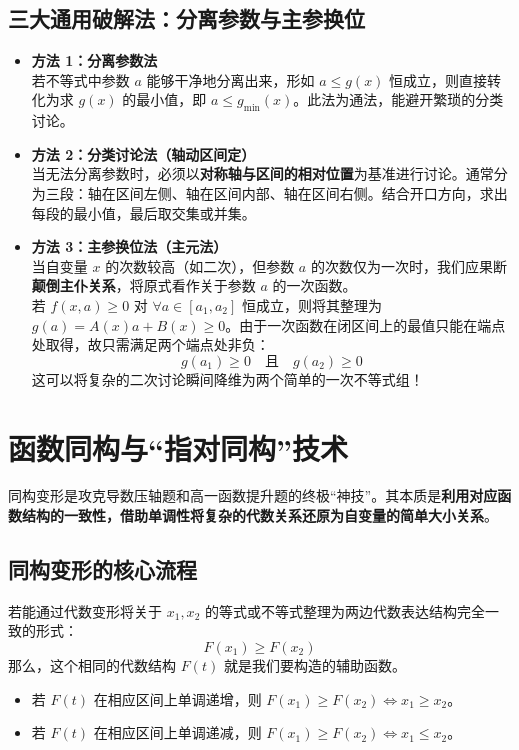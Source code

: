 \documentclass[11pt,a4paper]{ctexart}
\begin{document}
\subsection{三大通用破解法：分离参数与主参换位}
\begin{itemize}
  \item \textbf{方法 1：分离参数法} \\
    若不等式中参数 $a$ 能够干净地分离出来，形如 $a \le g(x)$ 恒成立，则直接转化为求 $g(x)$ 的最小值，即 $a \le g_{\min}(x)$。此法为通法，能避开繁琐的分类讨论。
  \item \textbf{方法 2：分类讨论法（轴动区间定）} \\
    当无法分离参数时，必须以\textbf{对称轴与区间的相对位置}为基准进行讨论。通常分为三段：轴在区间左侧、轴在区间内部、轴在区间右侧。结合开口方向，求出每段的最小值，最后取交集或并集。
  \item \textbf{方法 3：主参换位法（主元法）} \\
    当自变量 $x$ 的次数较高（如二次），但参数 $a$ 的次数仅为一次时，我们应果断\textbf{颠倒主仆关系}，将原式看作关于参数 $a$ 的一次函数。\\
    若 $f(x, a) \ge 0$ 对 $\forall a \in [a_1, a_2]$ 恒成立，则将其整理为 $g(a) = A(x)a + B(x) \ge 0$。由于一次函数在闭区间上的最值只能在端点处取得，故只需满足两个端点处非负：
    \[ g(a_1) \ge 0 \quad \text{且} \quad g(a_2) \ge 0 \]
    这可以将复杂的二次讨论瞬间降维为两个简单的一次不等式组！
\end{itemize}

\newpage

\section{函数同构与“指对同构”技术}

同构变形是攻克导数压轴题和高一函数提升题的终极“神技”。其本质是\textbf{利用对应函数结构的一致性，借助单调性将复杂的代数关系还原为自变量的简单大小关系}。

\subsection{同构变形的核心流程}
若能通过代数变形将关于 $x_1, x_2$ 的等式或不等式整理为两边代数表达结构完全一致的形式：
\[ F(x_1) \ge F(x_2) \]
那么，这个相同的代数结构 $F(t)$ 就是我们要构造的辅助函数。
\begin{itemize}
  \item 若 $F(t)$ 在相应区间上单调递增，则 $F(x_1) \ge F(x_2) \iff x_1 \ge x_2$。
  \item 若 $F(t)$ 在相应区间上单调递减，则 $F(x_1) \ge F(x_2) \iff x_1 \le x_2$。
\end{itemize}
\end{document}

